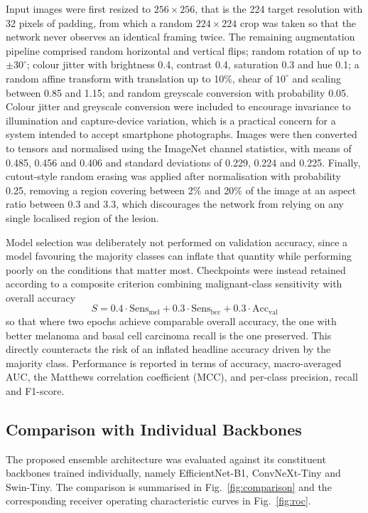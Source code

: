\documentclass[pdflatex,sn-mathphys-num]{sn-jnl}%
\begin{document}
Input images were first resized to $256 \times 256$, that is the 224 target resolution with 32
pixels of padding, from which a random $224 \times 224$ crop was taken so that the network
never observes an identical framing twice. The remaining augmentation pipeline comprised
random horizontal and vertical flips; random rotation of up to $\pm 30^{\circ}$; colour jitter
with brightness 0.4, contrast 0.4, saturation 0.3 and hue 0.1; a random affine transform with
translation up to 10\%, shear of $10^{\circ}$ and scaling between 0.85 and 1.15; and random
greyscale conversion with probability 0.05. Colour jitter and greyscale conversion were
included to encourage invariance to illumination and capture-device variation, which is a
practical concern for a system intended to accept smartphone photographs. Images were then
converted to tensors and normalised using the ImageNet channel statistics, with means of
0.485, 0.456 and 0.406 and standard deviations of 0.229, 0.224 and 0.225. Finally,
cutout-style random erasing was applied after normalisation with probability 0.25, removing a
region covering between 2\% and 20\% of the image at an aspect ratio between 0.3 and 3.3,
which discourages the network from relying on any single localised region of the lesion.

Model selection was deliberately not performed on validation accuracy, since a model favouring
the majority classes can inflate that quantity while performing poorly on the conditions that
matter most. Checkpoints were instead retained according to a composite criterion combining
malignant-class sensitivity with overall accuracy
\begin{equation}
S = 0.4 \cdot \mathrm{Sens}_{\mathrm{mel}} + 0.3 \cdot \mathrm{Sens}_{\mathrm{bcc}}
+ 0.3 \cdot \mathrm{Acc}_{\mathrm{val}}
\end{equation}
so that where two epochs achieve comparable overall accuracy, the one with better melanoma and
basal cell carcinoma recall is the one preserved. This directly counteracts the risk of an
inflated headline accuracy driven by the majority class. Performance is reported in terms of
accuracy, macro-averaged AUC, the Matthews correlation coefficient (MCC), and per-class
precision, recall and F1-score.

\subsection{Comparison with Individual Backbones}\label{sec:comparison}

The proposed ensemble architecture was evaluated against its constituent backbones trained
individually, namely EfficientNet-B1, ConvNeXt-Tiny and Swin-Tiny. The comparison is
summarised in Fig.~\ref{fig:comparison} and the corresponding receiver operating
characteristic curves in Fig.~\ref{fig:roc}.
\end{document}
